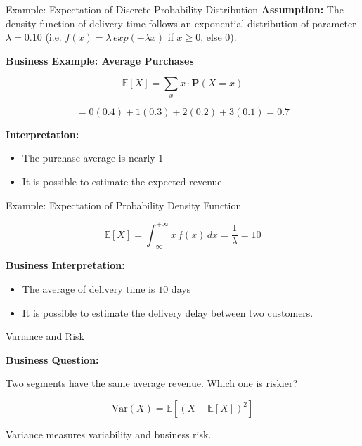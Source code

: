 \documentclass{beamer}
\begin{document}
\begin{frame}{Example: Expectation of Discrete Probability Distribution}
 \textbf{Assumption:}
The density function of delivery time follows an exponential distribution of parameter $\lambda=0.10$ (i.e. $f(x) = \lambda \, exp(-\lambda x)$ if $x \geq 0$, else $0$).


\textbf{Business Example: Average Purchases}

\[
\mathbb{E}[X] = \sum_x x \cdot \mathbf{P}(X=x)
\]

\[
= 0(0.4) + 1(0.3) + 2(0.2) + 3(0.1) = 0.7
\]

\vspace{0.5cm}

\textbf{Interpretation:}

\begin{itemize}
    \item The purchase average is nearly $1$
    \item It is possible to estimate the expected revenue 
\end{itemize}

\end{frame}

\begin{frame}{Example: Expectation of Probability Density Function}


\[
\mathbb{E}[X] = \int_{-\infty}^{+\infty} x \, f(x) \, dx = \frac{1}{\lambda} = 10
\]

\vspace{0.5cm}

\textbf{Business Interpretation:}

\begin{itemize}
    \item The average of delivery time is $10$ days
    \item It is possible to estimate the delivery delay between two customers.
\end{itemize}

\end{frame}

\begin{frame}{Variance and Risk}

\textbf{Business Question:}

Two segments have the same average revenue. Which one is riskier?

\vspace{0.5cm}

\[
\mathrm{Var}(X) = \mathbb{E}[(X - \mathbb{E}[X])^2]
\]

\vspace{0.5cm}

Variance measures variability and business risk. 

\end{frame}
\end{document}

